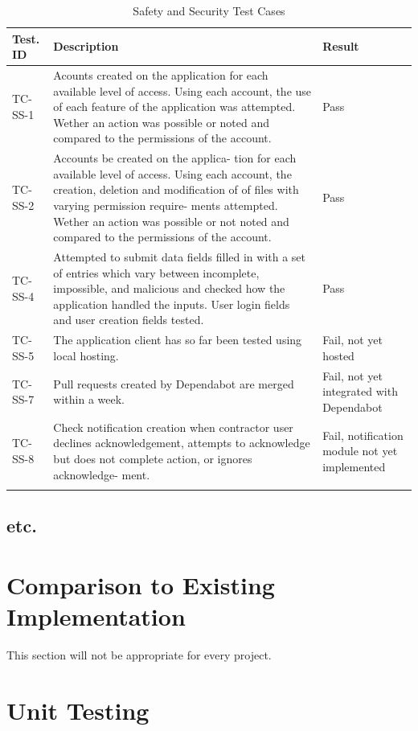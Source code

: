 \documentclass[12pt, titlepage]{article}
\begin{document}
\begin{longtable}{|m{1.75cm}|m{7cm}|m{3.25cm}|}
  \hline
  \textbf{Test. ID} & \textbf{Description} &
  \textbf{Result} \\
  \hline
  TC-SS-1 & Acounts created on the application
  for each available level of access. Using each account, the use of each
  feature of the application was attempted. Wether an action was
  possible or noted and compared to the permissions of the
  account. & Pass\\ \hline
  TC-SS-2 & Accounts be created on the applica-
  tion for each available level of access. Using each account, the creation,
  deletion and modification of of files with varying permission require-
  ments attempted. Wether an action was possible or
  not noted and compared to the permissions of the account. & Pass \\ \hline
  TC-SS-4 & Attempted to submit data fields filled in
  with a set of entries which vary between incomplete, impossible, and
  malicious and checked how the application handled the inputs. User
  login fields and user creation fields tested. & Pass\\ \hline
  TC-SS-5 & The application client has so far been tested using local
  hosting. & Fail, not yet hosted\\ \hline
  TC-SS-7 & Pull requests created by Dependabot are merged within
  a week. & Fail, not yet integrated with Dependabot\\ \hline
  TC-SS-8 & Check notification creation when contractor user declines
  acknowledgement, attempts to acknowledge but does not complete
  action, or ignores acknowledge-
  ment. & Fail, notification module not yet implemented\\ \hline
  \caption{Safety and Security Test Cases}
\end{longtable}

\subsection{etc.}

\section{Comparison to Existing Implementation}

This section will not be appropriate for every project.

\section{Unit Testing}
\end{document}
